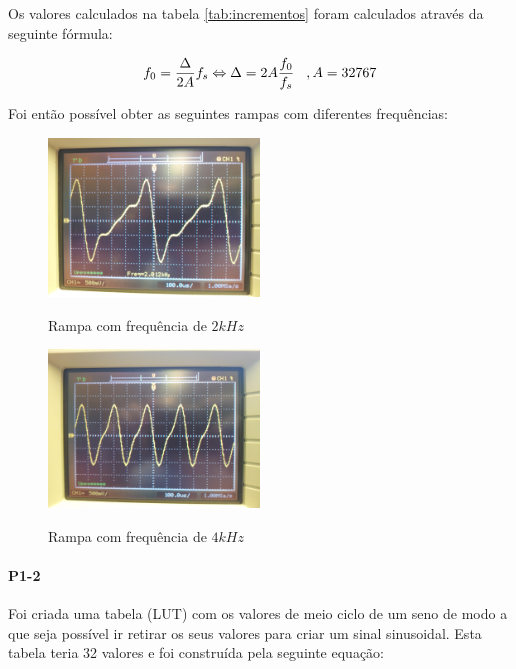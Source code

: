 \documentclass[11pt]{article}
\begin{document}
Os valores calculados na tabela \ref{tab:incrementos} foram calculados através da seguinte fórmula:

\begin{equation}
 f_{0}= \frac{\Delta}{2A}f_{s} \Leftrightarrow \Delta= 2A\frac{f_{0}}{f_{s}} \hspace{3 mm}, A=32767
\end{equation}

Foi então possível obter as seguintes rampas com diferentes frequências:


\begin{figure}[H]
	\centering
	\includegraphics[width=0.5\textwidth]{./P1_2kHz}~\\
	\caption{Rampa com frequência de $ 2 kHz $}
\end{figure}


\begin{figure}[H]
	\centering
	\includegraphics[width=0.5\textwidth]{./P1_4kHz}~\\
	\caption{Rampa com frequência de $ 4 kHz $}
\end{figure}

\paragraph{P1-2}
\label{para:P1-2}

Foi criada uma tabela (LUT) com os valores de meio ciclo de um seno de modo a que seja possível ir retirar os seus valores para criar um sinal sinusoidal. Esta tabela teria 32 valores e foi construída pela seguinte equação:
\end{document}
